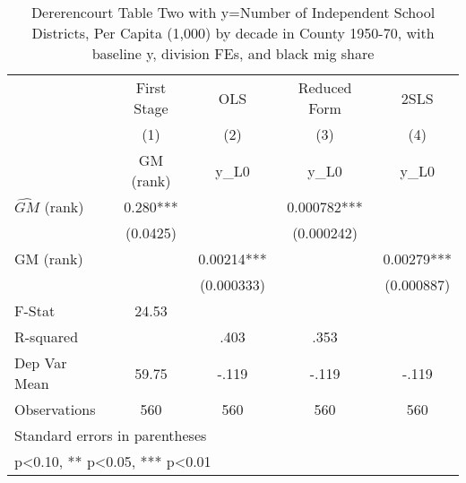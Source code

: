 \begin{table}[htbp]\centering
\def\sym#1{\ifmmode^{#1}\else\(^{#1}\)\fi}
\caption{Dererencourt Table Two with y=Number of Independent School Districts, Per Capita (1,000) by decade in County 1950-70, with baseline y, division FEs, and black mig share}
\begin{tabular}{l*{4}{c}}
\toprule
                    & First Stage   &         OLS   &Reduced Form   &        2SLS   \\
                    &\multicolumn{1}{c}{(1)}&\multicolumn{1}{c}{(2)}&\multicolumn{1}{c}{(3)}&\multicolumn{1}{c}{(4)}\\
                    &\multicolumn{1}{c}{GM  (rank)}&\multicolumn{1}{c}{y\_L0}&\multicolumn{1}{c}{y\_L0}&\multicolumn{1}{c}{y\_L0}\\
\midrule
$\hat{GM}$ (rank)   &       0.280***&               &    0.000782***&               \\
                    &    (0.0425)   &               &  (0.000242)   &               \\
\addlinespace
GM  (rank)          &               &     0.00214***&               &     0.00279***\\
                    &               &  (0.000333)   &               &  (0.000887)   \\
\midrule
F-Stat              &       24.53   &               &               &               \\
R-squared           &               &        .403   &        .353   &               \\
Dep Var Mean        &       59.75   &       -.119   &       -.119   &       -.119   \\
Observations        &         560   &         560   &         560   &         560   \\
\bottomrule
\multicolumn{5}{l}{\footnotesize Standard errors in parentheses}\\
\multicolumn{5}{l}{\footnotesize * p<0.10, ** p<0.05, *** p<0.01}\\
\end{tabular}
\end{table}
